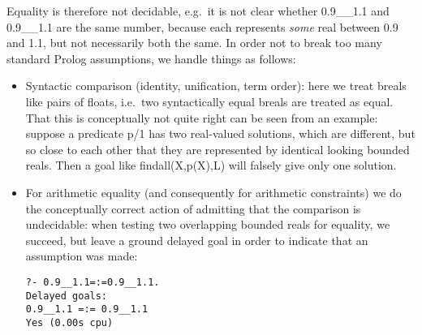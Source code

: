 Equality is therefore not decidable, e.g.\ it is not clear whether 0.9__1.1
and 0.9__1.1 are the same number, because each represents {\em some} real
between 0.9 and 1.1, but not necessarily both the same. In order not to break
too many standard Prolog assumptions, we handle things as follows:
\begin{itemize}
\item Syntactic comparison (identity, unification, term order):  here
	we treat breals like pairs of floats, i.e.\ two syntactically
	equal breals are treated as equal.  That this is conceptually
	not quite right can be seen from an example:  suppose a
	predicate p/1 has two real-valued solutions, which are
	different, but so close to each other that they are
	represented by identical looking bounded reals.  Then a goal
	like findall(X,p(X),L) will falsely give only one solution.
\item For arithmetic equality (and consequently for arithmetic constraints)
	we do the conceptually correct action of admitting that the comparison
	is  undecidable:  when testing two overlapping bounded reals for
	equality, we succeed, but leave a ground delayed goal  in order to
	indicate that an assumption was made:
\begin{verbatim}
?- 0.9__1.1=:=0.9__1.1.
Delayed goals:
0.9__1.1 =:= 0.9__1.1
Yes (0.00s cpu)
\end{verbatim}
\end{itemize}

